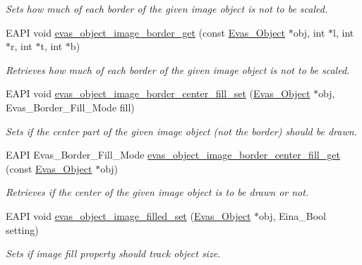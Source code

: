 \begin{DoxyCompactItemize}
\begin{DoxyCompactList}\small\item\em Sets how much of each border of the given image object is not to be scaled. \item\end{DoxyCompactList}\item 
EAPI void \hyperlink{group__Evas__Object__Image_gab666a37cbae8ee846cdeb518e7fd495c}{evas\_\-object\_\-image\_\-border\_\-get} (const \hyperlink{group__Evas__Object__Group_ga9e19e6dd1f517a0ba437c0114d3e7c97}{Evas\_\-Object} $\ast$obj, int $\ast$l, int $\ast$r, int $\ast$t, int $\ast$b)
\begin{DoxyCompactList}\small\item\em Retrieves how much of each border of the given image object is not to be scaled. \item\end{DoxyCompactList}\item 
EAPI void \hyperlink{group__Evas__Object__Image_ga4caf736585ad602e6748e434ac1f5fc6}{evas\_\-object\_\-image\_\-border\_\-center\_\-fill\_\-set} (\hyperlink{group__Evas__Object__Group_ga9e19e6dd1f517a0ba437c0114d3e7c97}{Evas\_\-Object} $\ast$obj, Evas\_\-Border\_\-Fill\_\-Mode fill)
\begin{DoxyCompactList}\small\item\em Sets if the center part of the given image object (not the border) should be drawn. \item\end{DoxyCompactList}\item 
EAPI Evas\_\-Border\_\-Fill\_\-Mode \hyperlink{group__Evas__Object__Image_ga04f8a4f69c5ad37d9229e4c39bb7c010}{evas\_\-object\_\-image\_\-border\_\-center\_\-fill\_\-get} (const \hyperlink{group__Evas__Object__Group_ga9e19e6dd1f517a0ba437c0114d3e7c97}{Evas\_\-Object} $\ast$obj)
\begin{DoxyCompactList}\small\item\em Retrieves if the center of the given image object is to be drawn or not. \item\end{DoxyCompactList}\item 
EAPI void \hyperlink{group__Evas__Object__Image_gae304964ee6769e559ca452c788f5aae4}{evas\_\-object\_\-image\_\-filled\_\-set} (\hyperlink{group__Evas__Object__Group_ga9e19e6dd1f517a0ba437c0114d3e7c97}{Evas\_\-Object} $\ast$obj, Eina\_\-Bool setting)
\begin{DoxyCompactList}\small\item\em Sets if image fill property should track object size. \item\end{DoxyCompactList}\item 

\end{DoxyCompactItemize}
